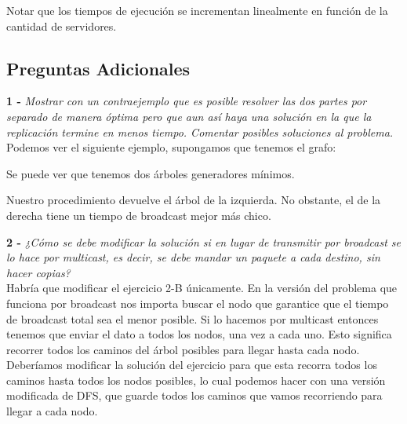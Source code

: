 Notar que los tiempos de ejecución se incrementan linealmente en función de la cantidad de servidores.
 
\subsection{Preguntas Adicionales}

\textbf{1 - }  \emph{Mostrar con un contraejemplo que es posible resolver las dos partes por separado de manera óptima pero que aun así haya una solución en la que la replicación termine en menos tiempo. Comentar posibles soluciones al problema.}\\

Podemos ver el siguiente ejemplo, supongamos que tenemos el grafo: 

\begin{figure}[H]
\centering
\def\svgwidth{140 pt}

\end{figure}

Se puede ver que tenemos dos árboles generadores mínimos. 

\begin{figure}[H]
\centering
\def\svgwidth{200 pt}

\end{figure}

Nuestro procedimiento devuelve el árbol de la izquierda. No obstante, el de la derecha tiene un tiempo de broadcast mejor más chico.  

\textbf{2 - }  \emph{¿Cómo se debe modificar la solución si en lugar de transmitir por broadcast se lo hace por multicast, es decir, se debe mandar un paquete a cada destino, sin hacer copias?}\\

Habría que modificar el ejercicio 2-B únicamente. En la versión del problema que funciona por broadcast nos importa buscar el nodo que garantice que el tiempo de broadcast total sea el menor posible. Si lo hacemos por multicast entonces tenemos que enviar el dato a todos los nodos, una vez a cada uno. Esto significa recorrer todos los caminos del árbol posibles para llegar hasta cada nodo. Deberíamos modificar la solución del ejercicio para que esta recorra todos los caminos hasta todos los nodos posibles, lo cual podemos hacer con una versión modificada de DFS, que guarde todos los caminos que vamos recorriendo para llegar a cada nodo.

